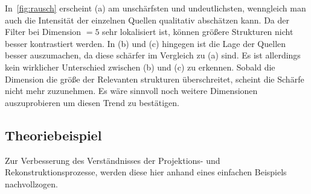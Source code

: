 \documentclass[slug=PET, room=Andreas-Schubert-Bau\,\ 424A, supervisor=Carsten\ Bittrich, coursedate=10.\ 01.\ 2020]{../../Lab_Report_LaTeX/lab_report}
\begin{document}
In~\ref{fig:rausch} erscheint (a) am unschärfsten und undeutlichsten,
wenngleich man auch die Intensität der einzelnen Quellen qualitativ
abschätzen kann. Da der Filter bei Dimension \(=5\) sehr lokalisiert
ist, k\"onnen gr\"o\ss{}ere Strukturen nicht besser kontrastiert
werden. In (b) und (c) hingegen ist die Lage der Quellen besser
auszumachen, da diese schärfer im Vergleich zu (a) sind. Es ist
allerdings kein wirklicher Unterschied zwischen (b) und (c) zu
erkennen. Sobald die Dimension die gr\"o\ss{}e der Relevanten
strukturen \"uberschreitet, scheint die Sch\"arfe nicht mehr
zuzunehmen. Es w\"are sinnvoll noch weitere Dimensionen auszuprobieren
um diesen Trend zu best\"atigen.



\subsection{Theoriebeispiel}
\label{sec:theobei}
Zur Verbesserung des Verst\"andnisses der Projektions- und
Rekonstruktionsprozesse, werden diese hier anhand eines einfachen
Beispiels nachvollzogen.
\end{document}
